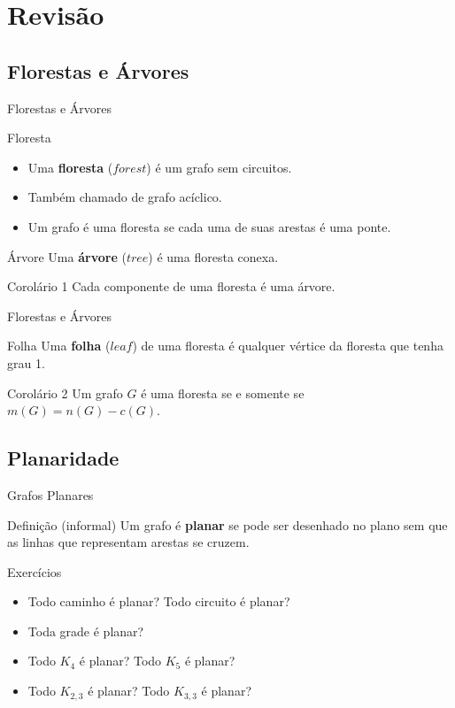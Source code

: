 \documentclass[xcolor=dvipsnames,table]{beamer}
\begin{document}
    \section{Revisão}
	\subsection{Florestas e Árvores}
	\begin{frame}{Florestas e Árvores}
		\begin{block}{Floresta}
			\begin{itemize}
				\item Uma {\bf floresta} ($forest$) é um grafo sem circuitos.   
				\item Também chamado de grafo acíclico.   
				\item Um grafo é uma floresta se cada uma de suas arestas é uma ponte. 
			\end{itemize}
		\end{block}   
		\begin{block}{Árvore}
			Uma {\bf árvore} ($tree$) é uma floresta conexa. 
		\end{block}   
		\begin{block}{Corolário 1}
			Cada componente de uma floresta é uma árvore.
		\end{block}
	\end{frame}
	
	\begin{frame}{Florestas e Árvores}
		\begin{block}{Folha}
			Uma {\bf folha} ($leaf$) de uma floresta é qualquer vértice da floresta que tenha grau 1.
		\end{block}   
		\begin{block}{Corolário 2}
			Um grafo $G$ é uma floresta se e somente se $m(G) = n(G) - c(G)$.
		\end{block}
	\end{frame}
	
	\subsection{Planaridade}
	\begin{frame}{Grafos Planares}
		\begin{block}{Definição (informal)}
			Um grafo é {\bf planar} se pode ser desenhado no plano sem que as linhas que representam arestas se cruzem.
		\end{block}   
		\begin{block}{Exercícios}
			\begin{itemize}
				\item Todo caminho é planar? Todo circuito é planar?   
				\item Toda grade é planar?   
				\item Todo $K_4$ é planar? Todo $K_5$ é planar?   
				\item Todo $K_{2,3}$ é planar? Todo $K_{3,3}$ é planar?
			\end{itemize}
		\end{block}
	\end{frame}
\end{document}
